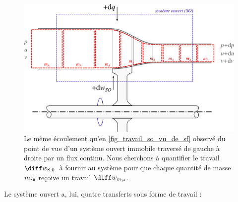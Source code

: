		\begin{figure}
			\begin{center}
				\includegraphics[width=\textwidth]{images/travail_sf_so2.png}
			\end{center}
			\caption{Le même écoulement qu’en \cref{fig_travail_so_vu_de_sf} observé du point de vue d’un système ouvert immobile traversé de gauche à droite par un flux continu. Nous cherchons à quantifier le travail $\diff w_\text{S.0.}$ à fournir au système pour que chaque quantité de masse $m_\A$ reçoive un travail $\diff w_{m_\A}$.}
			\label{fig_travail_so_vu_de_so}
		\end{figure}

		\clearfloats
		Le système ouvert a, lui, quatre transferts sous forme de travail :
	
